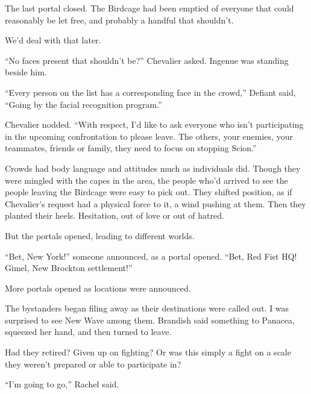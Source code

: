 





The last portal closed.  The Birdcage had been emptied of everyone that could reasonably be let free, and probably a handful that shouldn't.



We'd deal with that later.



``No faces present that shouldn't be?''  Chevalier asked.  Ingenue was standing beside him.



``Every person on the list has a corresponding face in the crowd,'' Defiant said, ``Going by the facial recognition program.''



Chevalier nodded.  ``With respect, I'd like to ask everyone who isn't participating in the upcoming confrontation to please leave.  The others, your enemies, your teammates, friends or family, they need to focus on stopping Scion.''



Crowds had body language and attitudes much as individuals did.  Though they were mingled with the capes in the area, the people who'd arrived to see the people leaving the Birdcage were easy to pick out.  They shifted position, as if Chevalier's request had a physical force to it, a wind pushing at them.  Then they planted their heels.  Hesitation, out of love or out of hatred.



But the portals opened, leading to different worlds.



``Bet, New York!''  someone announced, as a portal opened.  ``Bet, Red Fist HQ!  Gimel, New Brockton settlement!''



More portals opened as locations were announced.



The bystanders began filing away as their destinations were called out.  I was surprised to see New Wave among them.  Brandish said something to Panacea, squeezed her hand, and then turned to leave.



Had they retired?  Given up on fighting?  Or was this simply a fight on a scale they weren't prepared or able to participate in?



``I'm going to go,'' Rachel said.



